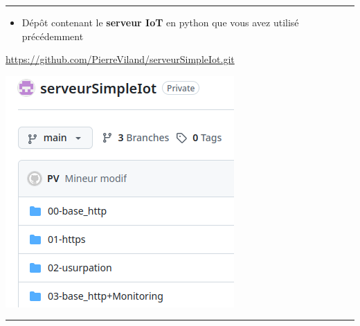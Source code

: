 \documentclass[french, 12pt]{article}%
\newcommand{\itemE}{\item[$\bullet$]}
\begin{document}
\begin{center}
 \rule{0.75\linewidth}{1pt}
 \end{center}
\begin{minipage}{0.6\linewidth}
\begin{itemize}
\itemE Dépôt contenant le \textbf{serveur IoT} en python que vous avez utilisé précédemment 
\end{itemize}
\href{https://github.com/PierreViland/serveurSimpleIot.git}{https://github.com/PierreViland/serveurSimpleIot.git}
\end{minipage}
\begin{minipage}{0.39\linewidth}

\begin{center}
\includegraphics[scale=0.5]{./ressource/serveurIotGlobal}
\end{center}
\end{minipage}


\begin{center}
 \rule{0.75\linewidth}{1pt}
 \end{center}
\end{document}

